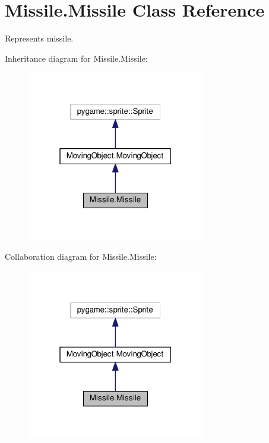 \hypertarget{classMissile_1_1Missile}{}\section{Missile.\+Missile Class Reference}
\label{classMissile_1_1Missile}


Represents missile.  




Inheritance diagram for Missile.\+Missile\+:\nopagebreak
\begin{figure}[H]
\begin{center}
\leavevmode
\includegraphics[width=220pt]{classMissile_1_1Missile__inherit__graph}
\end{center}
\end{figure}


Collaboration diagram for Missile.\+Missile\+:\nopagebreak
\begin{figure}[H]
\begin{center}
\leavevmode
\includegraphics[width=220pt]{classMissile_1_1Missile__coll__graph}
\end{center}
\end{figure}
